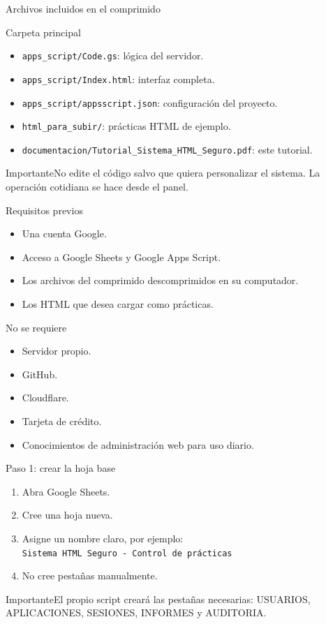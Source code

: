 \documentclass[aspectratio=169,11pt]{beamer}
\newcommand{\ruta}[1]{\texttt{#1}}
\newcommand{\alertbox}[1]{\begin{block}{Importante}#1\end{block}}
\begin{document}
\begin{frame}{Archivos incluidos en el comprimido}
\begin{block}{Carpeta principal}
\begin{itemize}
  \item \ruta{apps\_script/Code.gs}: lógica del servidor.
  \item \ruta{apps\_script/Index.html}: interfaz completa.
  \item \ruta{apps\_script/appsscript.json}: configuración del proyecto.
  \item \ruta{html\_para\_subir/}: prácticas HTML de ejemplo.
  \item \ruta{documentacion/Tutorial\_Sistema\_HTML\_Seguro.pdf}: este tutorial.
\end{itemize}
\end{block}
\alertbox{No edite el código salvo que quiera personalizar el sistema. La operación cotidiana se hace desde el panel.}
\end{frame}

\begin{frame}{Requisitos previos}
\begin{itemize}
  \item Una cuenta Google.
  \item Acceso a Google Sheets y Google Apps Script.
  \item Los archivos del comprimido descomprimidos en su computador.
  \item Los HTML que desea cargar como prácticas.
\end{itemize}
\begin{block}{No se requiere}
\begin{itemize}
  \item Servidor propio.
  \item GitHub.
  \item Cloudflare.
  \item Tarjeta de crédito.
  \item Conocimientos de administración web para uso diario.
\end{itemize}
\end{block}
\end{frame}

\begin{frame}{Paso 1: crear la hoja base}
\begin{enumerate}
  \item Abra Google Sheets.
  \item Cree una hoja nueva.
  \item Asigne un nombre claro, por ejemplo:\\
  \ruta{Sistema HTML Seguro - Control de prácticas}
  \item No cree pestañas manualmente.
\end{enumerate}
\alertbox{El propio script creará las pestañas necesarias: USUARIOS, APLICACIONES, SESIONES, INFORMES y AUDITORIA.}
\end{frame}
\end{document}
